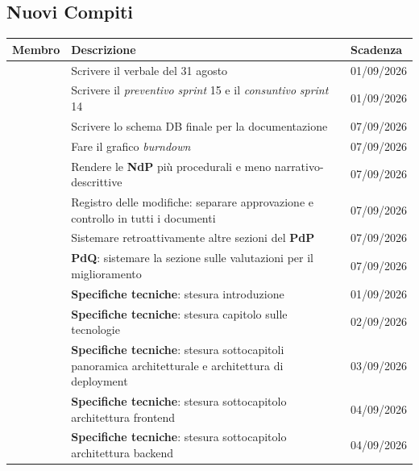 \documentclass[12pt, a4paper]{article}
\begin{document}
\subsection{Nuovi Compiti}
\renewcommand{\arraystretch}{1.3}
\begin{xltabular}{\textwidth}{|l|X|l|}
    \hline
    \textbf{Membro} & \textbf{Descrizione} & \textbf{Scadenza} \\ \hline
    \endfirsthead
         & Scrivere il verbale del 31 agosto & 01/09/2026 \\ \hline
         & Scrivere il \textit{preventivo} \textit{sprint} 15 e il \textit{consuntivo} \textit{sprint} 14 & 01/09/2026 \\ \hline
         & Scrivere lo schema DB finale per la documentazione & 07/09/2026 \\ \hline
         & Fare il grafico \textit{burndown} & 07/09/2026 \\ \hline
         & Rendere le \textbf{NdP} più procedurali e meno narrativo-descrittive & 07/09/2026 \\ \hline
         & Registro delle modifiche: separare approvazione e controllo in tutti i documenti & 07/09/2026 \\ \hline
         & Sistemare retroattivamente altre sezioni del \textbf{PdP} & 07/09/2026 \\ \hline
         & \textbf{PdQ}: sistemare la sezione sulle valutazioni per il miglioramento & 07/09/2026 \\ \hline
         & \textbf{Specifiche tecniche}: stesura introduzione & 01/09/2026 \\ \hline
         & \textbf{Specifiche tecniche}: stesura capitolo sulle tecnologie & 02/09/2026 \\ \hline
         & \textbf{Specifiche tecniche}: stesura sottocapitoli panoramica architetturale e architettura di deployment & 03/09/2026 \\ \hline
         & \textbf{Specifiche tecniche}: stesura sottocapitolo architettura frontend & 04/09/2026 \\ \hline
         & \textbf{Specifiche tecniche}: stesura sottocapitolo architettura backend & 04/09/2026 \\ \hline

\end{xltabular}
\end{document}
